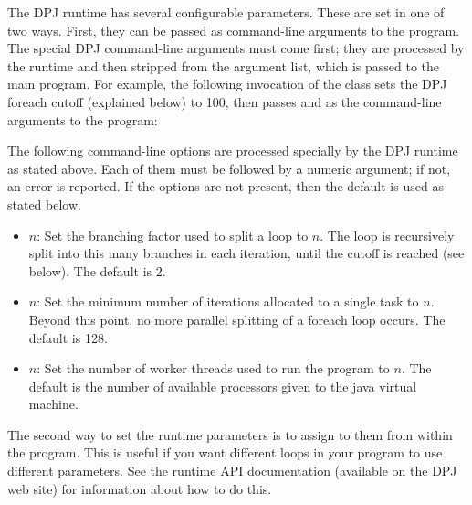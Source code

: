 The DPJ runtime has several configurable parameters.  These are set in
one of two ways.  First, they can be passed as command-line arguments
to the program.  The special DPJ command-line arguments must come
first; they are processed by the runtime and then stripped from the
argument list, which is passed to the main program.  For example, the
following invocation of the class  sets the DPJ foreach
cutoff (explained below) to 100, then passes  and  as
the command-line arguments to the program:
%
\begin{description}
\item {}
\end{description}

The following command-line options are processed specially by the
DPJ runtime as stated above.  Each of them must be followed by a
numeric argument; if not, an error is reported.  If the options are
not present, then the default is used as stated below.
%
\begin{itemize}
\item {} $n$: Set the branching factor used to
  split a  loop to $n$.  The loop is recursively split
  into this many branches in each iteration, until the cutoff is
  reached (see below).  The default is 2.
%
\item {} $n$: Set the minimum number of
   iterations allocated to a single task to $n$.  Beyond
  this point, no more parallel splitting of a foreach loop occurs.
  The default is 128.
%
\item {} $n$: Set the number of worker threads
  used to run the program to $n$.  The default is the number of
  available processors given to the java virtual machine.
%
\end{itemize}

The second way to set the runtime parameters is to assign to them from
within the program.  This is useful if you want different
 loops in your program to use different parameters.  See
the runtime API documentation (available on the DPJ web site) for
information about how to do this.
